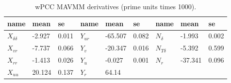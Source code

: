 \begin{table}[!htb]
    \footnotesize
    \centering
    \caption{wPCC MAVMM derivatives (prime units times 1000).}
    \label{\detokenize{06.10_results_wpcc:wpcc-derivatives}}
    \begin{tabular}{|T|T|T|T|T|T|T|T|T|}
\hline


name
&

mean
&

se
&

name
&

mean
&

se
&

name
&

mean
&

se
\\
\hline

\( X_{\delta\delta} \)
&

-2.927
&

0.011
&

\( Y_{ur} \)
&

-65.507
&

0.082
&

\( N_{\delta} \)
&

-1.993
&

0.002
\\


\( X_{vr} \)
&

-7.737
&

0.066
&

\( Y_{v} \)
&

-20.347
&

0.016
&

\( N_{T\delta} \)
&

-5.392
&

0.599
\\


\( X_{rr} \)
&

-1.413
&

0.026
&

\( Y_{u} \)
&

-0.027
&

0.001
&

\( N_{r} \)
&

-37.341
&

0.096
\\


\( X_{uu} \)
&

20.124
&

0.137
&

\( Y_{r} \)
&

64.14
&


\end{tabular}
\end{table}

